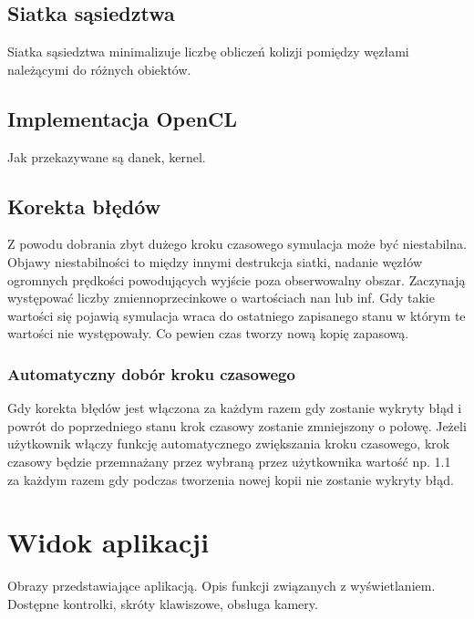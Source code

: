 \documentclass[12pt, letterpaper]{report}
\begin{document}
    \subsection{Siatka sąsiedztwa}
    Siatka sąsiedztwa minimalizuje liczbę obliczeń kolizji pomiędzy węzłami należącymi do różnych obiektów.

    \subsection{Implementacja OpenCL}
    Jak przekazywane są danek, kernel.

    \subsection{Korekta błędów}
    Z powodu dobrania zbyt dużego kroku czasowego symulacja może być niestabilna.
    Objawy niestabilności to między innymi destrukcja siatki, nadanie węzłów 
    ogromnych prędkości powodujących wyjście poza obserwowalny obszar.
    Zaczynają występować liczby zmiennoprzecinkowe o wartościach nan lub inf.
    Gdy takie wartości się pojawią symulacja wraca do ostatniego zapisanego stanu w którym 
    te wartości nie występowały. Co pewien czas tworzy nową kopię zapasową.

    \subsubsection{Automatyczny dobór kroku czasowego}
    Gdy korekta błędów jest włączona za każdym razem gdy zostanie wykryty błąd i powrót do poprzedniego stanu
    krok czasowy zostanie zmniejszony o połowę. Jeżeli użytkownik włączy funkcję automatycznego zwiększania
    kroku czasowego, krok czasowy będzie przemnażany przez wybraną przez użytkownika wartość np. 1.1 za 
    każdym razem gdy podczas tworzenia nowej kopii nie zostanie wykryty błąd.

    \section{Widok aplikacji}
    Obrazy przedstawiające aplikacją. Opis funkcji związanych z wyświetlaniem. 
    Dostępne kontrolki, skróty klawiszowe, obsługa kamery.
\end{document}
